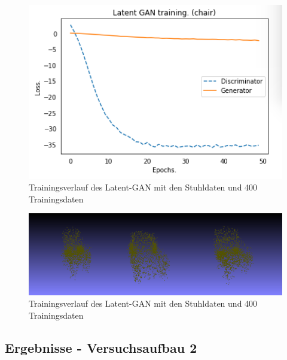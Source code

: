 \documentclass{llncs}
\begin{document}
\begin{figure}[htbp] 
	\centering
	\includegraphics[width=1.2\textwidth]{raw_gan_latent_gan_chair_result_400_example.png}
	\caption{Trainingsverlauf des Latent-GAN mit den Stuhldaten und 400 Trainingsdaten}
	\label{fig:Bild37}
\end{figure}

\begin{figure}[htbp] 
	\centering
	\includegraphics[width=1.2\textwidth]{raw_gan_latent_gan_chair_example_400.png}
	\caption{Trainingsverlauf des Latent-GAN mit den Stuhldaten und 400 Trainingsdaten}
	\label{fig:Bild37}
\end{figure}
\subsection{Ergebnisse - Versuchsaufbau 2}
\end{document}
